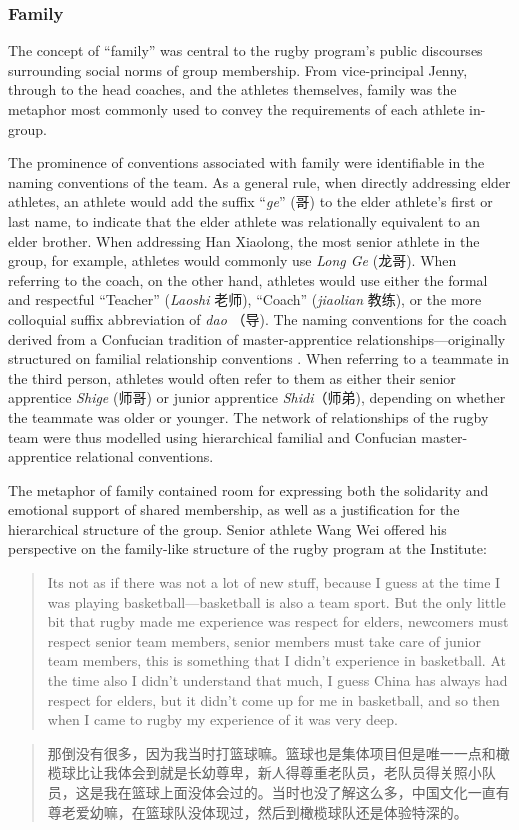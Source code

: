 \begin{CJK}{UTF8}{gbsn}
\subsubsection{Family}
The concept of ``family'' was central to the rugby program's public discourses surrounding social norms of group membership.  From vice-principal Jenny, through to the head coaches, and the athletes themselves, family was the metaphor most commonly used to convey the requirements of each athlete in-group.

The prominence of conventions associated with family were identifiable in the naming conventions of the team.  As a general rule, when directly addressing elder athletes, an athlete would add the suffix ``\textit{ge}'' (哥) to the elder athlete's first or last name, to indicate that the elder athlete was relationally equivalent to an elder brother.  When addressing Han Xiaolong, the most senior athlete in the group, for example, athletes would commonly use \textit{Long Ge} (龙哥).  When referring to the coach, on the other hand, athletes would use either the formal and respectful ``Teacher'' (\textit{Laoshi} 老师), ``Coach'' (\textit{jiaolian} 教练), or the more colloquial suffix abbreviation of \textit{dao} （导). The naming conventions for the coach derived from a Confucian tradition of master-apprentice relationships---originally structured on familial relationship conventions \citep{Spence1999}. When referring to a teammate in the third person, athletes would often refer to them as either their senior apprentice \textit{Shige} (师哥) or junior apprentice \textit{Shidi}（师弟), depending on whether the teammate was older or younger.  The network of relationships of the rugby team were thus modelled using hierarchical familial and Confucian master-apprentice relational conventions.

The metaphor of family contained room for expressing both the solidarity and emotional support of shared membership, as well as a justification for the hierarchical structure of the group.  Senior athlete Wang Wei offered his perspective on the family-like structure of the rugby program at the Institute:
    \begin{quote}
      Its not as if there was not a lot of new stuff, because I guess at the time I was playing basketball---basketball is also a team sport.  But the only little bit that rugby made me experience was respect for elders, newcomers must respect senior team members, senior members must take care of junior team members, this is something that I didn’t experience in basketball.  At the time also I didn’t understand that much, I guess China has always had respect for elders, but it didn’t come up for me in basketball, and so then when I came to rugby my experience of it was very deep.
    \end{quote}
    \begin{quote}
       那倒没有很多，因为我当时打篮球嘛。篮球也是集体项目但是唯一一点和橄榄球比让我体会到就是长幼尊卑，新人得尊重老队员，老队员得关照小队员，这是我在篮球上面没体会过的。当时也没了解这么多，中国文化一直有尊老爱幼嘛，在篮球队没体现过，然后到橄榄球队还是体验特深的。
    \end{quote}


\end{CJK}
